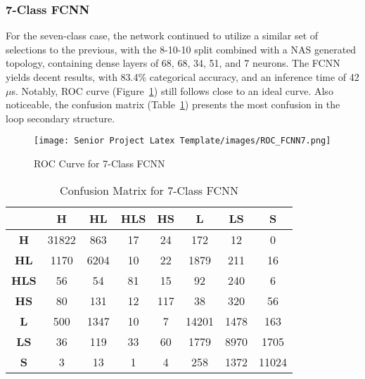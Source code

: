 \documentclass[12pt,letterpaper,oneside,reqno]{book}
\theoremstyle{plain}
\theoremstyle{definition}
\theoremstyle{plain}
\theoremstyle{remark}
\theoremstyle{plain}
\theoremstyle{definition}
\theoremstyle{plain}
\begin{document}
\subsubsection{7-Class FCNN}
For the seven-class case, the network continued to utilize a similar set of selections to the previous, with the 8-10-10 split combined with a NAS generated topology, containing dense layers of 68, 68, 34, 51, and 7 neurons. The FCNN yields decent results, with 83.4\% categorical accuracy, and an inference time of 42$\mu$s. Notably, ROC curve (Figure~\ref{fig:ROCFCNN7}) still follows close to an ideal curve. Also noticeable, the confusion matrix (Table~\ref{tab:confmatfcnn7}) presents the most confusion in the loop secondary structure.
\begin{figure}[H]
    \centering
    \texttt{[image: Senior Project Latex Template/images/ROC\_FCNN7.png]}
    \caption{ROC Curve for 7-Class FCNN}
    \label{fig:ROCFCNN7}
\end{figure}
\begin{table}[H]
\centering
		\begin{tabular}{|c|c|c|c|c|c|c|c|}
				\hline
				& \textbf{H} & \textbf{HL} & \textbf{HLS} & \textbf{HS} & \textbf{L} & \textbf{LS} & \textbf{S} \\
				\hline
				\textbf{H} & 31822 & 863 & 17 & 24 & 172 & 12 & 0 \\
				\hline
				\textbf{HL} & 1170 & 6204 & 10 & 22 & 1879 & 211 & 16 \\
				\hline
				\textbf{HLS} & 56 & 54 & 81 & 15 & 92 & 240 & 6 \\
				\hline
				\textbf{HS} & 80 & 131 & 12 & 117 & 38 & 320 & 56 \\
				\hline
				\textbf{L} & 500 & 1347 & 10 & 7 & 14201 & 1478 & 163 \\
				\hline
				\textbf{LS} & 36 & 119 & 33 & 60 & 1779 & 8970 & 1705 \\
				\hline
				\textbf{S} & 3 & 13 & 1 & 4 & 258 & 1372 & 11024\\
				\hline
				
		\end{tabular}
		\caption{Confusion Matrix for 7-Class FCNN}
		\label{tab:confmatfcnn7}
\end{table}
\end{document}
